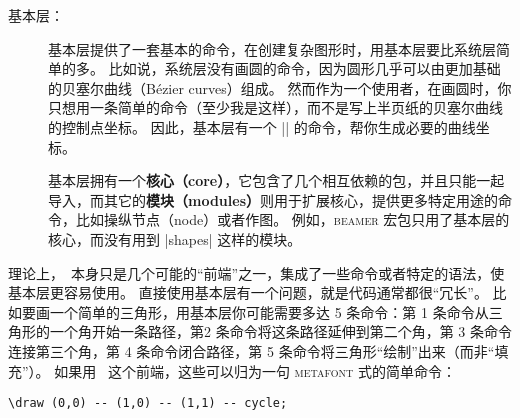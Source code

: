 \begin{onehalfspacing}
\begin{description}
\item[基本层：]
基本层提供了一套基本的命令，在创建复杂图形时，用基本层要比系统层简单的多。
比如说，系统层没有画圆的命令，因为圆形几乎可以由更加基础的贝塞尔曲线（B\'ezier curves）组成。
然而作为一个使用者，在画圆时，你只想用一条简单的命令（至少我是这样），而不是写上半页纸的贝塞尔曲线的控制点坐标。
因此，基本层有一个 |\pgfpathcircle| 的命令，帮你生成必要的曲线坐标。

基本层拥有一个\textbf{核心（core）}，它包含了几个相互依赖的包，并且只能一起导入，而其它的\textbf{模块（modules）}则用于扩展核心，提供更多特定用途的命令，比如操纵节点（node）或者作图。
例如，\textsc{beamer} 宏包只用了基本层的核心，而没有用到 |shapes| 这样的模块。
\end{description}

理论上，\tikzname\ 本身只是几个可能的“前端”之一，集成了一些命令或者特定的语法，使基本层更容易使用。
直接使用基本层有一个问题，就是代码通常都很“冗长”。
比如要画一个简单的三角形，用基本层你可能需要多达 5 条命令：第 1 条命令从三角形的一个角开始一条路径，第2 条命令将这条路径延伸到第二个角，第 3 条命令连接第三个角，第 4 条命令闭合路径，第 5 条命令将三角形“绘制”出来（而非“填充”）。
如果用 \tikzname\ 这个前端，这些可以归为一句 \textsc{metafont} 式的简单命令：
\begin{verbatim}
\draw (0,0) -- (1,0) -- (1,1) -- cycle;
\end{verbatim}


\end{onehalfspacing}
